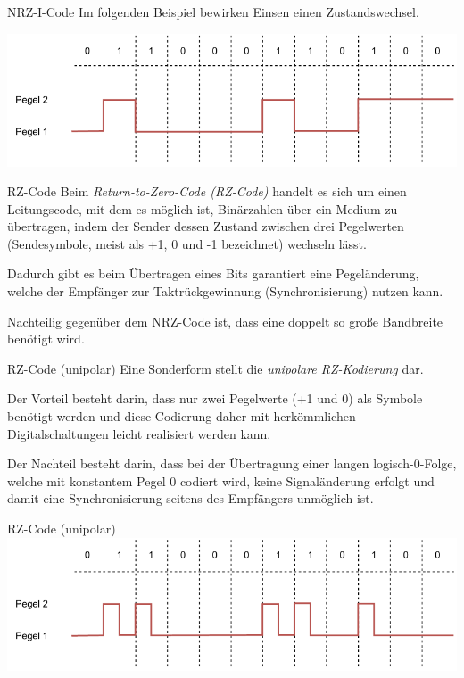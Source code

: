 \begin{example}{NRZ-I-Code}
    Im folgenden Beispiel bewirken Einsen einen Zustandswechsel.

    \centering
    \includegraphics[width=.9\textwidth]{includes/figures/example_nrzi.pdf}
\end{example}

\begin{defi}{RZ-Code}
    Beim \emph{Return-to-Zero-Code (RZ-Code)} handelt es sich um einen Leitungscode, mit dem es möglich ist, Binärzahlen über ein Medium zu übertragen, indem der Sender dessen Zustand zwischen drei Pegelwerten (Sendesymbole, meist als +1, 0 und -1 bezeichnet) wechseln lässt.

    Dadurch gibt es beim Übertragen eines Bits garantiert eine Pegeländerung, welche der Empfänger zur Taktrückgewinnung (Synchronisierung) nutzen kann.

    Nachteilig gegenüber dem NRZ-Code ist, dass eine doppelt so große Bandbreite benötigt wird.
\end{defi}

\begin{bonus}{RZ-Code (unipolar)}
    Eine Sonderform stellt die \emph{unipolare RZ-Kodierung} dar.

    Der Vorteil besteht darin, dass nur zwei Pegelwerte (+1 und 0) als Symbole benötigt werden und diese Codierung daher mit herkömmlichen Digitalschaltungen leicht realisiert werden kann.

    Der Nachteil besteht darin, dass bei der Übertragung einer langen logisch-0-Folge, welche mit konstantem Pegel 0 codiert wird, keine Signaländerung erfolgt und damit eine Synchronisierung seitens des Empfängers unmöglich ist.
\end{bonus}

\begin{example}{RZ-Code (unipolar)}
    \centering
    \includegraphics[width=.9\textwidth]{includes/figures/example_rz.pdf}
\end{example}

